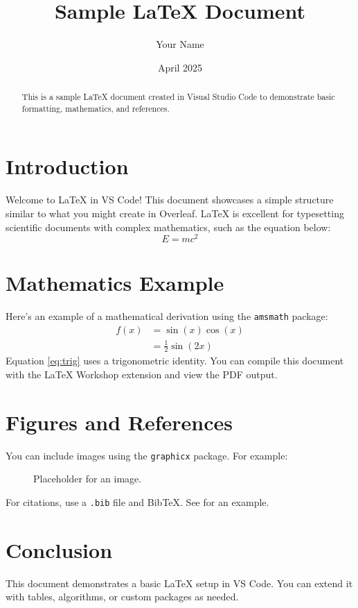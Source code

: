 \documentclass[12pt]{article}
\title{Sample LaTeX Document}
\author{Your Name}
\date{April 2025}
\begin{document}
\maketitle

\begin{abstract}
This is a sample LaTeX document created in Visual Studio Code to demonstrate basic formatting, mathematics, and references.
\end{abstract}

\section{Introduction}
Welcome to LaTeX in VS Code! This document showcases a simple structure similar to what you might create in Overleaf. LaTeX is excellent for typesetting scientific documents with complex mathematics, such as the equation below:
\begin{equation} 
E = mc^2
\end{equation}

\section{Mathematics Example}
Here’s an example of a mathematical derivation using the \texttt{amsmath} package:
\begin{align}
f(x) &= \sin(x) \cos(x) \\
     &= \frac{1}{2} \sin(2x) \label{eq:trig}
\end{align}
Equation \eqref{eq:trig} uses a trigonometric identity. You can compile this document with the LaTeX Workshop extension and view the PDF output.

\section{Figures and References}
You can include images using the \texttt{graphicx} package. For example:
\begin{figure}[h]
    \centering
    \caption{Placeholder for an image.}
    \label{fig:example}
\end{figure}

For citations, use a \texttt{.bib} file and BibTeX. See \cite{knuth1997art} for an example.

\section{Conclusion}
This document demonstrates a basic LaTeX setup in VS Code. You can extend it with tables, algorithms, or custom packages as needed.



\end{document}
